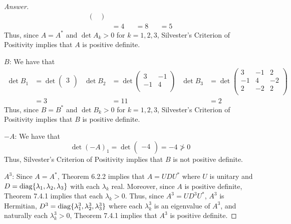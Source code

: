 \documentclass[../psets.tex]{subfiles}
\begin{document}
\begin{enumerate}[label={\textbf{4.\arabic*.}}]
\begin{proof}[Answer]
\begin{align*}
\begin{pmatrix}
                    \end{pmatrix}\\
            &= 4&
                &= 8&
                    &= 5
        \end{align*}
        Thus, since $A=A^*$ and $\det A_k>0$ for $k=1,2,3$, Silvester's Criterion of Positivity implies that $A$ is positive definite.\par
        \underline{$B$}: We have that
        \begin{align*}
            \det B_1 &= \det
            \begin{pmatrix}
                3\\
            \end{pmatrix}&
                \det B_2 &= \det
                \begin{pmatrix}
                    3 & -1\\
                    -1 & 4\\
                \end{pmatrix}&
                    \det B_3 &= \det
                    \begin{pmatrix}
                        3 & -1 & 2\\
                        -1 & 4 & -2\\
                        2 & -2 & 2\\
                    \end{pmatrix}\\
            &= 3&
                &= 11&
                    &= 2
        \end{align*}
        Thus, since $B=B^*$ and $\det B_k>0$ for $k=1,2,3$, Silvester's Criterion of Positivity implies that $B$ is positive definite.\par
        \underline{$-A$}: We have that
        \begin{equation*}
            \det(-A)_1 = \det
            \begin{pmatrix}
                -4\\
            \end{pmatrix}
            = -4 \not> 0
        \end{equation*}
        Thus, Silvester's Criterion of Positivity implies that $B$ is not positive definite.\par
        \underline{$A^3$}: Since $A=A^*$, Theorem 6.2.2 implies that $A=UDU^*$ where $U$ is unitary and $D=\operatorname{diag}\{\lambda_1,\lambda_2,\lambda_3\}$ with each $\lambda_k$ real. Moreover, since $A$ is positive definite, Theorem 7.4.1 implies that each $\lambda_k>0$. Thus, since $A^3=UD^3U^*$, $A^3$ is Hermitian, $D^3=\operatorname{diag}\{\lambda_1^3,\lambda_2^3,\lambda_3^3\}$ where each $\lambda_k^3$ is an eigenvalue of $A^3$, and naturally each $\lambda_k^3>0$, Theorem 7.4.1 implies that $A^3$ is positive definite.\par

\end{proof}
\end{enumerate}
\end{document}
